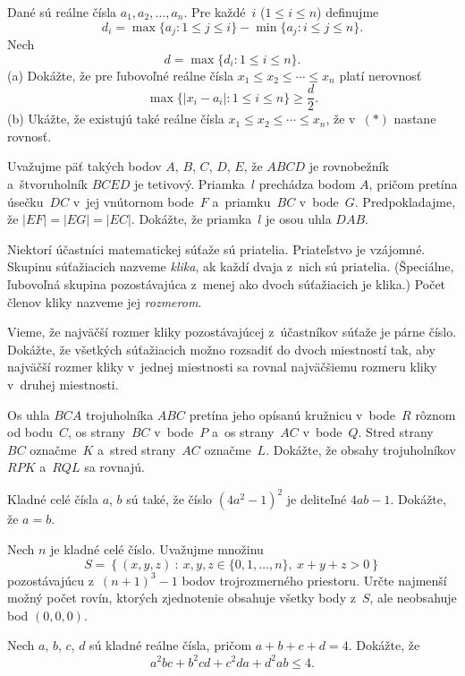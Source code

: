 {%
Dané sú reálne čísla $a_1, a_2, \dots, a_n$. Pre
každé~$i$ ($1 \le i \le n$) definujme
$$
d_i = \max \{ a_j : 1 \le j \le i\} - \min \{ a_j : i \le j \le n\}.
$$
Nech
$$
d = \max \{d_i : 1 \le i \le n\}.
$$
\ite (a) Dokážte, že pre ľubovoľné reálne čísla
$x_1 \le x_2 \le \cdots \le x_n$ platí nerovnosť
$$
\max \{ |x_i - a_i | : 1 \le i \le n \} \ge \frac d2. \tag{$\ast$}
$$
\ite (b) Ukážte, že existujú také reálne čísla $x_1 \le x_2 \le \cdots \leq
x_n$, že v~$(\ast)$ nastane rovnosť.}

{%
Uvažujme päť takých bodov $A$, $B$, $C$, $D$, $E$, že $ABCD$ je rovnobežník
a~štvoruholník $BCED$ je tetivový. Priamka~$l$ prechádza bodom $A$, pričom pretína
úsečku~$DC$ v~jej vnútornom bode~$F$ a~priamku~$BC$ v~bode~$G$. Predpokladajme, že
$|EF|=|EG|=|EC|$. Dokážte, že priamka~$l$ je osou uhla $DAB$.}

{%
Niektorí účastníci matematickej súťaže sú priatelia. Priateľstvo je vzájomné. Skupinu súťažiacich nazveme {\it klika}, ak každí dvaja z~nich sú priatelia. (Špeciálne, ľubovoľná skupina pozostávajúca z~menej ako dvoch súťažiacich je klika.) Počet členov kliky nazveme jej {\it rozmerom}.

Vieme, že najväčší rozmer kliky pozostávajúcej z~účastníkov súťaže je párne číslo. Dokážte, že všetkých súťažiacich možno rozsadiť do dvoch miestností tak, aby najväčší rozmer kliky v~jednej miestnosti sa rovnal najväčšiemu rozmeru kliky v~druhej miestnosti.}

{%
Os uhla $BCA$ trojuholníka $ABC$ pretína jeho opísanú kružnicu v~bode~$R$ rôznom od bodu~$C$,
os strany~$BC$ v~bode~$P$ a~os strany~$AC$ v~bode~$Q$. Stred strany~$BC$ označme~$K$
a~stred strany~$AC$ označme~$L$. Dokážte, že obsahy trojuholníkov
$RPK$ a~$RQL$ sa rovnajú.}

{%
Kladné celé čísla $a$, $b$ sú také, že číslo $(4a^2 -1)^2$ je deliteľné $4ab-1$. Dokážte, že $a=b$.}

{%
Nech $n$ je kladné celé číslo. Uvažujme množinu
$$
S = \left\{ (x, y, z)\ :\ x, y, z \in \{0,1, \ldots, n\},\ x+y+z >0\right\}
$$
pozostávajúcu z~$(n+1)^3-1$ bodov trojrozmerného priestoru.
Určte najmenší možný počet rovín,
ktorých zjednotenie obsahuje všetky body z~$S$, ale neobsahuje bod $(0,0,0)$.}

{%
Nech $a$, $b$, $c$, $d$ sú kladné reálne čísla, pričom $a+b+c+d=4$. Dokážte, že
$$
a^2bc+b^2cd+c^2da+d^2ab\le4.
$$}

